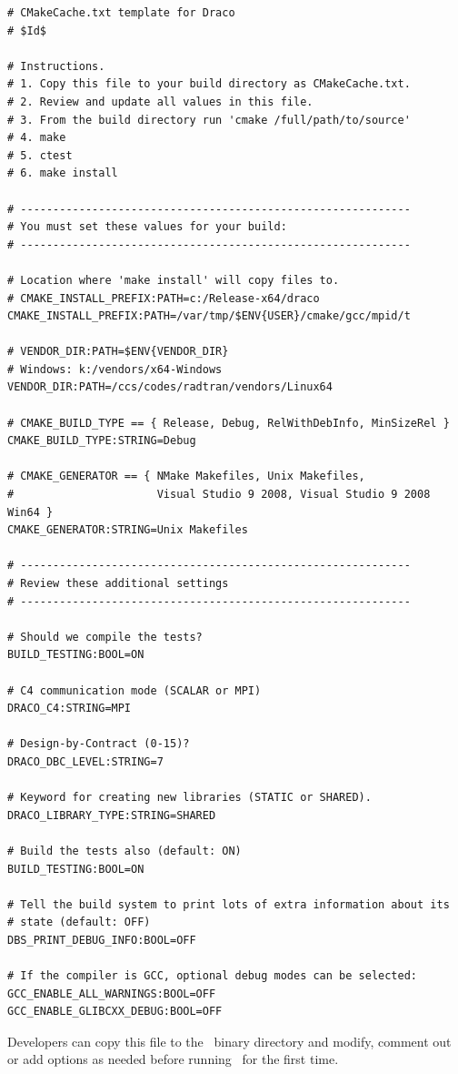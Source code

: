 \begin{lstlisting}[basicstyle=\footnotesize, xleftmargin=0.0in, xrightmargin=0.0in, caption={A sample \comp{CMakeCache.txt} file.}, float=tn,label={lst:cmakecachetxt}]
# CMakeCache.txt template for Draco
# $Id$

# Instructions.
# 1. Copy this file to your build directory as CMakeCache.txt.
# 2. Review and update all values in this file.
# 3. From the build directory run 'cmake /full/path/to/source'
# 4. make
# 5. ctest
# 6. make install

# ------------------------------------------------------------
# You must set these values for your build:
# ------------------------------------------------------------

# Location where 'make install' will copy files to.
# CMAKE_INSTALL_PREFIX:PATH=c:/Release-x64/draco
CMAKE_INSTALL_PREFIX:PATH=/var/tmp/$ENV{USER}/cmake/gcc/mpid/t

# VENDOR_DIR:PATH=$ENV{VENDOR_DIR}
# Windows: k:/vendors/x64-Windows
VENDOR_DIR:PATH=/ccs/codes/radtran/vendors/Linux64

# CMAKE_BUILD_TYPE == { Release, Debug, RelWithDebInfo, MinSizeRel }
CMAKE_BUILD_TYPE:STRING=Debug

# CMAKE_GENERATOR == { NMake Makefiles, Unix Makefiles, 
#                      Visual Studio 9 2008, Visual Studio 9 2008 Win64 }
CMAKE_GENERATOR:STRING=Unix Makefiles

# ------------------------------------------------------------
# Review these additional settings
# ------------------------------------------------------------

# Should we compile the tests?
BUILD_TESTING:BOOL=ON

# C4 communication mode (SCALAR or MPI)
DRACO_C4:STRING=MPI

# Design-by-Contract (0-15)?
DRACO_DBC_LEVEL:STRING=7
 
# Keyword for creating new libraries (STATIC or SHARED).
DRACO_LIBRARY_TYPE:STRING=SHARED

# Build the tests also (default: ON)
BUILD_TESTING:BOOL=ON

# Tell the build system to print lots of extra information about its
# state (default: OFF)
DBS_PRINT_DEBUG_INFO:BOOL=OFF

# If the compiler is GCC, optional debug modes can be selected:
GCC_ENABLE_ALL_WARNINGS:BOOL=OFF
GCC_ENABLE_GLIBCXX_DEBUG:BOOL=OFF
\end{lstlisting}  
Developers can copy this file to the \draco\ binary directory and modify, comment out or add options as needed before running \cmake\ for the first time.

